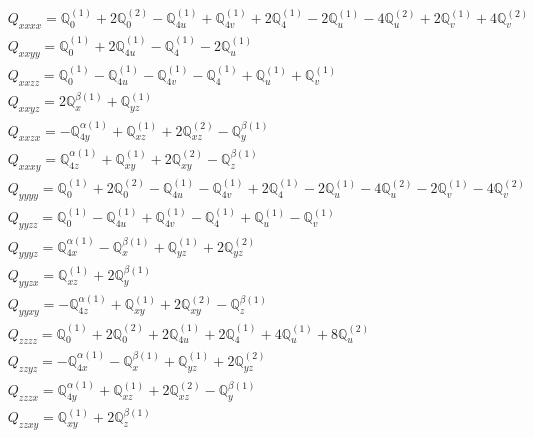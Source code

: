 \documentclass[fleqn,8pt,landscape]{jsarticle}
\begin{document}
\begin{align*}
& Q_{xxxx} = \mathbb{Q}_{0}^{(1)} + 2 \mathbb{Q}_{0}^{(2)} - \mathbb{Q}_{4u}^{(1)} + \mathbb{Q}_{4v}^{(1)} + 2 \mathbb{Q}_{4}^{(1)} - 2 \mathbb{Q}_{u}^{(1)} - 4 \mathbb{Q}_{u}^{(2)} + 2 \mathbb{Q}_{v}^{(1)} + 4 \mathbb{Q}_{v}^{(2)} \\
& Q_{xxyy} = \mathbb{Q}_{0}^{(1)} + 2 \mathbb{Q}_{4u}^{(1)} - \mathbb{Q}_{4}^{(1)} - 2 \mathbb{Q}_{u}^{(1)} \\
& Q_{xxzz} = \mathbb{Q}_{0}^{(1)} - \mathbb{Q}_{4u}^{(1)} - \mathbb{Q}_{4v}^{(1)} - \mathbb{Q}_{4}^{(1)} + \mathbb{Q}_{u}^{(1)} + \mathbb{Q}_{v}^{(1)} \\
& Q_{xxyz} = 2 \mathbb{Q}_{x}^{\beta(1)} + \mathbb{Q}_{yz}^{(1)} \\
& Q_{xxzx} = - \mathbb{Q}_{4y}^{\alpha(1)} + \mathbb{Q}_{xz}^{(1)} + 2 \mathbb{Q}_{xz}^{(2)} - \mathbb{Q}_{y}^{\beta(1)} \\
& Q_{xxxy} = \mathbb{Q}_{4z}^{\alpha(1)} + \mathbb{Q}_{xy}^{(1)} + 2 \mathbb{Q}_{xy}^{(2)} - \mathbb{Q}_{z}^{\beta(1)} \\
& Q_{yyyy} = \mathbb{Q}_{0}^{(1)} + 2 \mathbb{Q}_{0}^{(2)} - \mathbb{Q}_{4u}^{(1)} - \mathbb{Q}_{4v}^{(1)} + 2 \mathbb{Q}_{4}^{(1)} - 2 \mathbb{Q}_{u}^{(1)} - 4 \mathbb{Q}_{u}^{(2)} - 2 \mathbb{Q}_{v}^{(1)} - 4 \mathbb{Q}_{v}^{(2)} \\
& Q_{yyzz} = \mathbb{Q}_{0}^{(1)} - \mathbb{Q}_{4u}^{(1)} + \mathbb{Q}_{4v}^{(1)} - \mathbb{Q}_{4}^{(1)} + \mathbb{Q}_{u}^{(1)} - \mathbb{Q}_{v}^{(1)} \\
& Q_{yyyz} = \mathbb{Q}_{4x}^{\alpha(1)} - \mathbb{Q}_{x}^{\beta(1)} + \mathbb{Q}_{yz}^{(1)} + 2 \mathbb{Q}_{yz}^{(2)} \\
& Q_{yyzx} = \mathbb{Q}_{xz}^{(1)} + 2 \mathbb{Q}_{y}^{\beta(1)} \\
& Q_{yyxy} = - \mathbb{Q}_{4z}^{\alpha(1)} + \mathbb{Q}_{xy}^{(1)} + 2 \mathbb{Q}_{xy}^{(2)} - \mathbb{Q}_{z}^{\beta(1)} \\
& Q_{zzzz} = \mathbb{Q}_{0}^{(1)} + 2 \mathbb{Q}_{0}^{(2)} + 2 \mathbb{Q}_{4u}^{(1)} + 2 \mathbb{Q}_{4}^{(1)} + 4 \mathbb{Q}_{u}^{(1)} + 8 \mathbb{Q}_{u}^{(2)} \\
& Q_{zzyz} = - \mathbb{Q}_{4x}^{\alpha(1)} - \mathbb{Q}_{x}^{\beta(1)} + \mathbb{Q}_{yz}^{(1)} + 2 \mathbb{Q}_{yz}^{(2)} \\
& Q_{zzzx} = \mathbb{Q}_{4y}^{\alpha(1)} + \mathbb{Q}_{xz}^{(1)} + 2 \mathbb{Q}_{xz}^{(2)} - \mathbb{Q}_{y}^{\beta(1)} \\
& Q_{zzxy} = \mathbb{Q}_{xy}^{(1)} + 2 \mathbb{Q}_{z}^{\beta(1)} \\

\end{align*}
\end{document}

